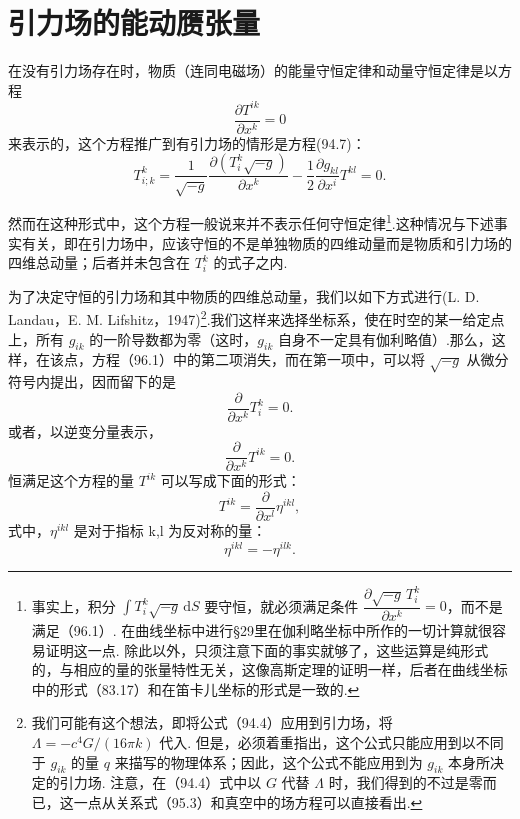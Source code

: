 \begin{xiti}
\end{xiti}

\section{引力场的能动赝张量}

在没有引力场存在时，物质（连同电磁场）的能量守恒定律和动量守恒定律是以方程
\begin{equation*}
  \frac{\partial T^{ik}}{\partial x^k}=0
\end{equation*}
来表示的，这个方程推广到有引力场的情形是方程(94.7)：
\begin{equation}
  T^k_{i;k}=\frac{1}{\sqrt{-g}}
  \frac{\partial(T_i^k\sqrt{-g})}{\partial x^k}
  -\frac{1}{2}\frac{\partial g_{kl}}{\partial x^i}T^{kl}=0.
\end{equation}

然而在这种形式中，这个方程一般说来并不表示任何守恒定律\footnote{事实上，积分 $\int T^k_i\sqrt{-g}\,\mathrm{d}S$ 要守恒，就必须满足条件 $\dfrac{\partial\sqrt{-g}\,T^k_i}{\partial x^k}=0$，而不是满足（96.1）. 在曲线坐标中进行§29里在伽利略坐标中所作的一切计算就很容易证明这一点. 除此以外，只须注意下面的事实就够了，这些运算是纯形式的，与相应的量的张量特性无关，这像高斯定理的证明一样，后者在曲线坐标中的形式（83.17）和在笛卡儿坐标的形式是一致的.}.这种情况与下述事实有关，即在引力场中，应该守恒的不是单独物质的四维动量而是物质和引力场的四维总动量；后者并未包含在 $T_i^k$ 的式子之内.

为了决定守恒的引力场和其中物质的四维总动量，我们以如下方式进行(L. D. Landau，E. M. Lifshitz，1947)\footnote{我们可能有这个想法，即将公式（94.4）应用到引力场，将 $\Lambda=-c^4G/(16\pi k)$ 代入. 但是，必须着重指出，这个公式只能应用到以不同于 $g_{ik}$ 的量 $q$ 来描写的物理体系；因此，这个公式不能应用到为 $g_{ik}$ 本身所决定的引力场. 注意，在（94.4）式中以 $G$ 代替 $\Lambda$ 时，我们得到的不过是零而已，这一点从关系式（95.3）和真空中的场方程可以直接看出.}.我们这样来选择坐标系，使在时空的某一给定点上，所有 $g_{ik}$ 的一阶导数都为零（这时，$g_{ik}$ 自身不一定具有伽利略值）.那么，这样，在该点，方程（96.1）中的第二项消失，而在第一项中，可以将 $\sqrt{-g}$ 从微分符号内提出，因而留下的是
\begin{equation*}
  \frac{\partial}{\partial x^k}T_i^k=0.
\end{equation*}
或者，以逆变分量表示，
\begin{equation*}
  \frac{\partial}{\partial x^k}T^{ik}=0.
\end{equation*}
恒满足这个方程的量 $T^{ik}$ 可以写成下面的形式：
\begin{equation*}
  T^{ik}=\frac{\partial}{\partial x^l}\eta^{ikl},
\end{equation*}
式中，$\eta^{ikl}$ 是对于指标 k,l 为反对称的量：
\begin{equation*}
  \eta^{ikl}=-\eta^{ilk}.
\end{equation*}

